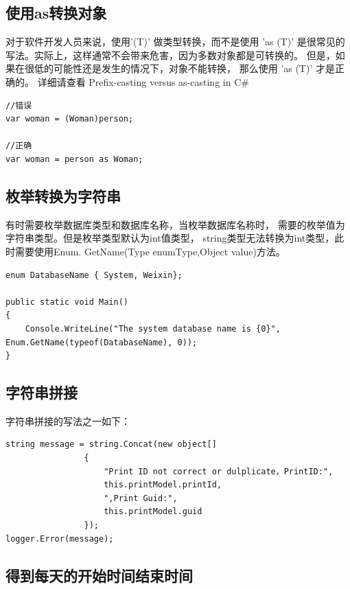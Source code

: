 \documentclass{book}
\begin{document}
\subsection{使用as转换对象}

对于软件开发人员来说，使用'(T)' 做类型转换，而不是使用 'as (T)' 是很常见的写法。实际上，这样通常不会带来危害，因为多数对象都是可转换的。
但是，如果在很低的可能性还是发生的情况下，对象不能转换，
那么使用 'as (T)' 才是正确的。 
详细请查看 Prefix-casting versus as-casting in C\# 
\begin{lstlisting}	
//错误
var woman = (Woman)person;
	
//正确
var woman = person as Woman;
\end{lstlisting}

\subsection{枚举转换为字符串}

有时需要枚举数据库类型和数据库名称，当枚举数据库名称时，
需要的枚举值为字符串类型。但是枚举类型默认为int值类型，
string类型无法转换为int类型，此时需要使用Enum.
GetName(Type enumType,Object value)方法。

\begin{lstlisting}[language={[Sharp]C}]
enum DatabaseName { System, Weixin};    

public static void Main() 
{        
    Console.WriteLine("The system database name is {0}", Enum.GetName(typeof(DatabaseName), 0));
}	
\end{lstlisting}	

\subsection{字符串拼接}
	
字符串拼接的写法之一如下：	
	
\begin{lstlisting}
string message = string.Concat(new object[]
                {
                    "Print ID not correct or dulplicate，PrintID:",
                    this.printModel.printId,
                    ",Print Guid:",
                    this.printModel.guid
                });                        
logger.Error(message);
\end{lstlisting}	
	

\subsection{得到每天的开始时间结束时间}
\end{document}
